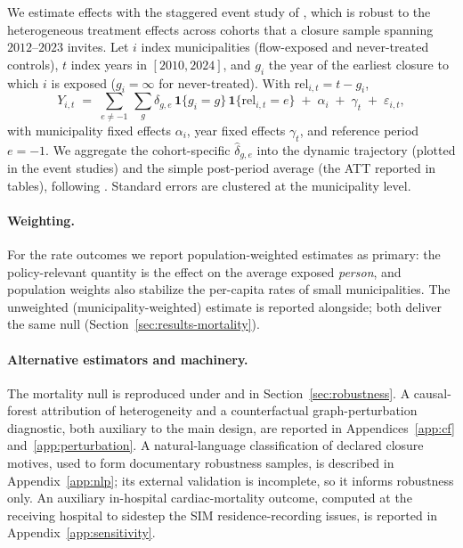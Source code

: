 We estimate effects with the staggered event study of
\citet{sunAbraham2021}, which is robust to the heterogeneous
treatment effects across cohorts that a closure sample spanning
$2012$--$2023$ invites. Let $i$ index municipalities (flow-exposed and
never-treated controls), $t$ index years in $[2010, 2024]$, and $g_i$
the year of the earliest closure to which $i$ is exposed
($g_i = \infty$ for never-treated). With $\mathrm{rel}_{i,t} = t - g_i$,
\begin{equation}
  Y_{i, t} \;=\; \sum_{e \neq -1} \,
  \sum_{g} \delta_{g, e} \, \mathbf{1}\{g_i = g\} \,
  \mathbf{1}\{\mathrm{rel}_{i, t} = e\}
  \;+\; \alpha_i \;+\; \gamma_t \;+\; \varepsilon_{i, t},
  \label{eq:sa-estimating}
\end{equation}
with municipality fixed effects $\alpha_i$, year fixed effects
$\gamma_t$, and reference period $e = -1$. We aggregate the
cohort-specific $\widehat{\delta}_{g,e}$ into the dynamic trajectory
(plotted in the event studies) and the simple post-period average (the
ATT reported in tables), following \citet{sunAbraham2021}. Standard
errors are clustered at the municipality level.

\paragraph{Weighting.} For the rate outcomes we report
population-weighted estimates as primary: the policy-relevant quantity is
the effect on the average exposed \emph{person}, and population weights
also stabilize the per-capita rates of small municipalities. The
unweighted (municipality-weighted) estimate is reported alongside; both
deliver the same null (Section~\ref{sec:results-mortality}).

\paragraph{Alternative estimators and machinery.} The mortality null is
reproduced under \citet{cs2021} and \citet{borusyak2024} in
Section~\ref{sec:robustness}. A causal-forest attribution of
heterogeneity \citep{atheyWager2019} and a counterfactual
graph-perturbation diagnostic, both auxiliary to the main design, are
reported in Appendices~\ref{app:cf} and~\ref{app:perturbation}.
A natural-language classification of declared closure motives, used to
form documentary robustness samples, is described in
Appendix~\ref{app:nlp}; its external validation is incomplete, so it
informs robustness only. An auxiliary in-hospital cardiac-mortality
outcome, computed at the receiving hospital to sidestep the SIM
residence-recording issues, is reported in Appendix~\ref{app:sensitivity}.
